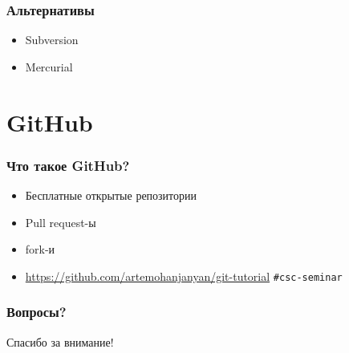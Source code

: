 \documentclass[pdf,russian]{beamer}
\begin{document}
\begin{frame}
    \frametitle{Альтернативы}
    \begin{itemize}
        \item Subversion
        \item Mercurial
    \end{itemize}
\end{frame}

\section{GitHub}

\begin{frame}
    \frametitle{Что такое GitHub?}
    \begin{itemize}
        \pause
        \item Бесплатные открытые репозитории
        \pause
        \item Pull request-ы
        \pause
        \item fork-и
        \pause
        \item \url{https://github.com/artemohanjanyan/git-tutorial}
            \pause\texttt{\#{}csc-seminar}
    \end{itemize}
\end{frame}

\begin{frame}
    \frametitle{Вопросы?}
    \pause
    Спасибо за внимание!
\end{frame}
\end{document}
